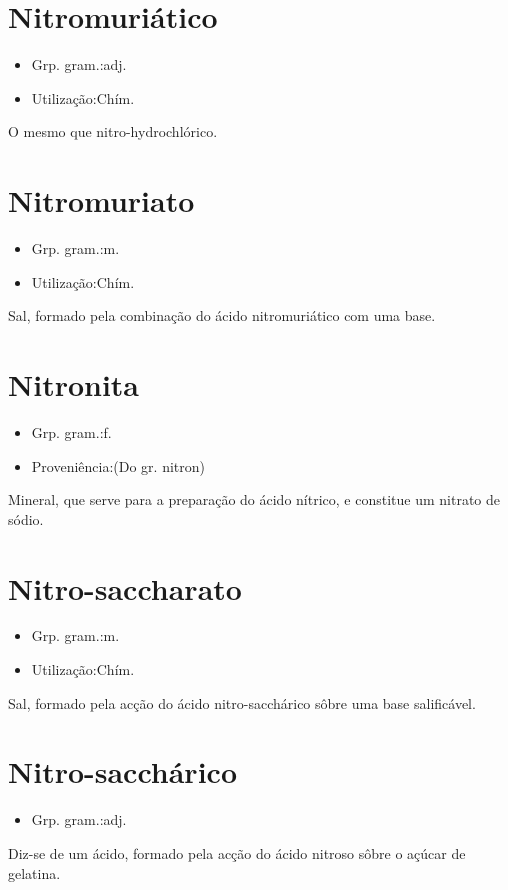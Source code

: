 \section{Nitromuriático}
\begin{itemize}
\item {Grp. gram.:adj.}
\end{itemize}
\begin{itemize}
\item {Utilização:Chím.}
\end{itemize}
O mesmo que \textunderscore nitro-hydrochlórico\textunderscore .
\section{Nitromuriato}
\begin{itemize}
\item {Grp. gram.:m.}
\end{itemize}
\begin{itemize}
\item {Utilização:Chím.}
\end{itemize}
Sal, formado pela combinação do ácido nitromuriático com uma base.
\section{Nitronita}
\begin{itemize}
\item {Grp. gram.:f.}
\end{itemize}
\begin{itemize}
\item {Proveniência:(Do gr. \textunderscore nitron\textunderscore )}
\end{itemize}
Mineral, que serve para a preparação do ácido nítrico, e constitue um nitrato de sódio.
\section{Nitro-saccharato}
\begin{itemize}
\item {Grp. gram.:m.}
\end{itemize}
\begin{itemize}
\item {Utilização:Chím.}
\end{itemize}
Sal, formado pela acção do ácido nitro-sacchárico sôbre uma base salificável.
\section{Nitro-sacchárico}
\begin{itemize}
\item {Grp. gram.:adj.}
\end{itemize}
Diz-se de um ácido, formado pela acção do ácido nitroso sôbre o açúcar de gelatina.

